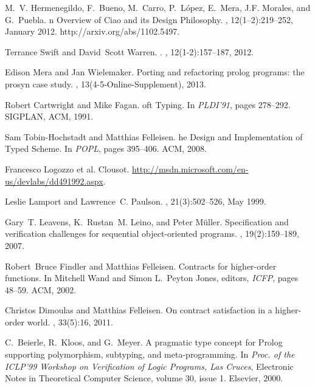 \documentclass{llncs}
\begin{document}
\begin{thebibliography}{10}
M.~V. Hermenegildo, F.~Bueno, M.~Carro, P.~L\'{o}pez, E.~Mera, J.F. Morales,
  and G.~Puebla.
n {O}verview of {C}iao and its {D}esign {P}hilosophy.
, 12(1--2):219--252,
  January 2012.
\newblock http://arxiv.org/abs/1102.5497.

Terrance Swift and David~Scott Warren.
.
, 12(1-2):157--187, 2012.

Edison Mera and Jan Wielemaker.
\newblock Porting and refactoring prolog programs: the prosyn case study.
, 13(4-5-Online-Supplement), 2013.

Robert Cartwright and Mike Fagan.
oft {T}yping.
\newblock In {\em PLDI'91}, pages 278--292. SIGPLAN, ACM, 1991.

Sam Tobin-Hochstadt and Matthias Felleisen.
he {D}esign and {I}mplementation of {T}yped {S}cheme.
\newblock In {\em POPL}, pages 395--406. ACM, 2008.

Francesco {Logozzo et al.}
\newblock Clousot.
\newblock \url{http://msdn.microsoft.com/en-us/devlabs/dd491992.aspx}.

Leslie Lamport and Lawrence~C. Paulson.
,
  21(3):502--526, May 1999.

Gary~T. Leavens, K.~Rustan~M. Leino, and Peter M{\"u}ller.
\newblock Specification and verification challenges for sequential
  object-oriented programs.
, 19(2):159--189, 2007.

Robert~Bruce Findler and Matthias Felleisen.
\newblock Contracts for higher-order functions.
\newblock In Mitchell Wand and Simon L.~Peyton Jones, editors, {\em ICFP},
  pages 48--59. ACM, 2002.

Christos Dimoulas and Matthias Felleisen.
\newblock On contract satisfaction in a higher-order world.
, 33(5):16, 2011.

C.~Beierle, R.~Kloos, and G.~Meyer.
\newblock A pragmatic type concept for {P}rolog supporting polymorphism,
  subtyping, and meta-programming.
\newblock In {\em Proc. of the ICLP'99 Workshop on Verification of Logic
  Programs, Las Cruces}, Electronic Notes in Theoretical Computer Science,
  volume 30, issue 1. Elsevier, 2000.


\end{thebibliography}
\end{document}
